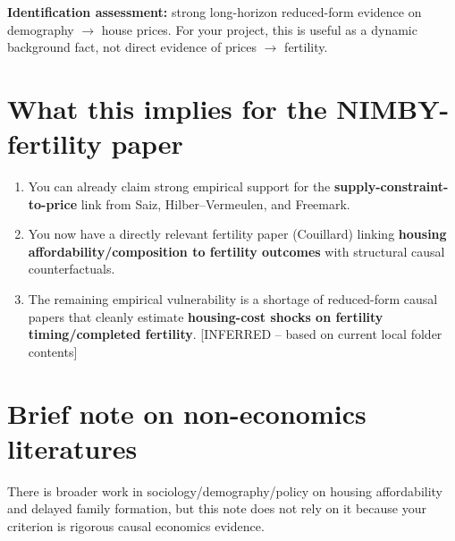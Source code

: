\documentclass[11pt]{article}
\begin{document}
\textbf{Identification assessment:} strong long-horizon reduced-form evidence on demography $\rightarrow$ house prices. For your project, this is useful as a dynamic background fact, not direct evidence of prices $\rightarrow$ fertility.

\section{What this implies for the NIMBY-fertility paper}
\begin{enumerate}
    \item You can already claim strong empirical support for the \textbf{supply-constraint-to-price} link from Saiz, Hilber--Vermeulen, and Freemark.
    \item You now have a directly relevant fertility paper (Couillard) linking \textbf{housing affordability/composition to fertility outcomes} with structural causal counterfactuals.
    \item The remaining empirical vulnerability is a shortage of reduced-form causal papers that cleanly estimate \textbf{housing-cost shocks on fertility timing/completed fertility}. [INFERRED -- based on current local folder contents]
\end{enumerate}

\section{Brief note on non-economics literatures}
There is broader work in sociology/demography/policy on housing affordability and delayed family formation, but this note does not rely on it because your criterion is rigorous causal economics evidence.
\end{document}
